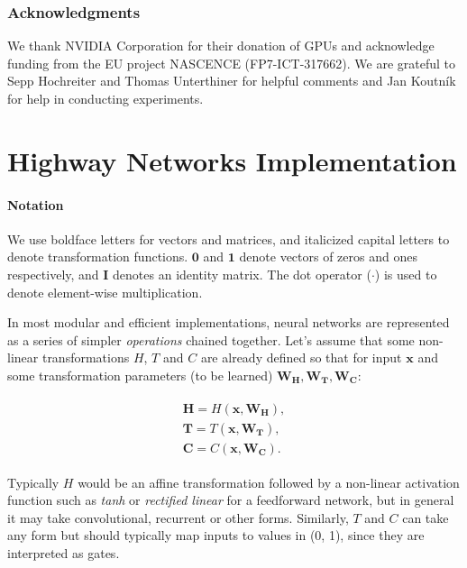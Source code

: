 \documentclass{article}
\renewcommand{\vec}[1]{\mathbf{#1}}
\begin{document}
\subsubsection*{Acknowledgments}
We thank NVIDIA Corporation for their donation of GPUs and acknowledge funding from the EU project NASCENCE (FP7-ICT-317662). We are grateful to Sepp Hochreiter and Thomas Unterthiner for helpful comments and Jan Koutn\'{i}k for help in conducting experiments.

\small


\appendix
\section{Highway Networks Implementation}\label{sec:impl}

\paragraph{Notation}
We use boldface letters for vectors and matrices, and italicized capital letters to denote transformation functions. $\mathbf{0}$ and $\mathbf{1}$ denote vectors of zeros and ones respectively, and $\vec{I}$ denotes an identity matrix. The dot operator ($\cdotp$) is used to denote element-wise multiplication.

In most modular and efficient implementations, neural networks are represented as a series of simpler \emph{operations} chained together. Let's assume that some non-linear transformations $H$, $T$ and $C$ are already defined so that for input $\vec{x}$ and some transformation parameters (to be learned) $\vec{W_H}, \vec{W_T}, \vec{W_C}$:

\begin{align}
\label{eqn:basic}
\begin{split}
\vec{H} = H(\vec{x}, \vec{W_H}),
\\
\vec{T} = T(\vec{x}, \vec{W_T}),
\\
\vec{C} = C(\vec{x}, \vec{W_C}).
\end{split}
\end{align}

Typically $H$ would be an affine transformation followed by a non-linear activation function such as \emph{tanh} or \emph{rectified linear} for a feedforward network, but in general it may take convolutional, recurrent or other forms. Similarly, $T$ and $C$ can take any form but should typically map inputs to values in (0, 1), since they are interpreted as gates.
\end{document}
